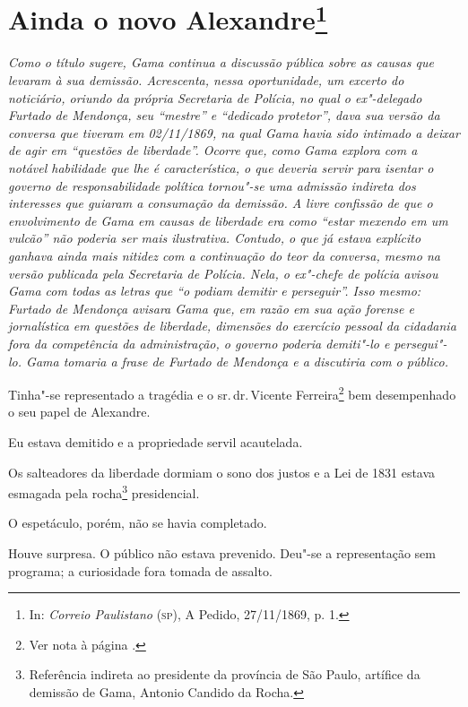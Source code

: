 \chapter{Ainda o novo Alexandre\footnote[*]{In: \emph{Correio
  Paulistano} (\textsc{sp}), A Pedido, 27/11/1869, p. 1.}}

\begin{flushleft}
{\footnotesize\itshape
Como o título sugere, Gama continua a discussão pública sobre as
causas que levaram à sua demissão. Acrescenta, nessa oportunidade, um
excerto do noticiário, oriundo da própria Secretaria de Polícia, no qual
o ex"-delegado Furtado de Mendonça, seu ``mestre'' e ``dedicado protetor'',
dava sua versão da conversa que tiveram em 02/11/1869, na qual Gama
havia sido intimado a deixar de agir em ``questões de liberdade''. Ocorre
que, como Gama explora com a notável habilidade que lhe é
característica, o que deveria servir para isentar o governo de
responsabilidade política tornou"-se uma admissão indireta dos
interesses que guiaram a consumação da demissão. A livre confissão de
que o envolvimento de Gama em causas de liberdade era como ``estar
mexendo em um vulcão'' não poderia ser mais ilustrativa. Contudo, o que
já estava explícito ganhava ainda mais nitidez com a continuação do teor
da conversa, mesmo na versão publicada pela Secretaria de Polícia. Nela,
o ex"-chefe de polícia avisou Gama com todas as letras que ``o podiam
demitir e perseguir''. Isso mesmo: Furtado de Mendonça avisara Gama que,
em razão em sua ação forense e jornalística em questões de liberdade,
dimensões do exercício pessoal da cidadania fora da competência da
administração, o governo poderia demiti"-lo e persegui"-lo. Gama tomaria a
frase de Furtado de Mendonça e a discutiria com o público.}
\end{flushleft}

Tinha"-se representado a tragédia e o sr.\,dr.\,Vicente Ferreira\footnote{Ver nota à página \pageref{bueno}.} bem desempenhado o seu
papel de Alexandre.

Eu estava demitido e a propriedade servil acautelada.

Os salteadores da liberdade dormiam o sono dos justos e a Lei de 1831
estava esmagada pela rocha\footnote{Referência indireta ao presidente
  da província de São Paulo, artífice da demissão de Gama, Antonio
  Candido da Rocha.} presidencial.

O espetáculo, porém, não se havia completado.

Houve surpresa. O público não estava prevenido. Deu"-se a representação
sem programa; a curiosidade fora tomada de assalto.

